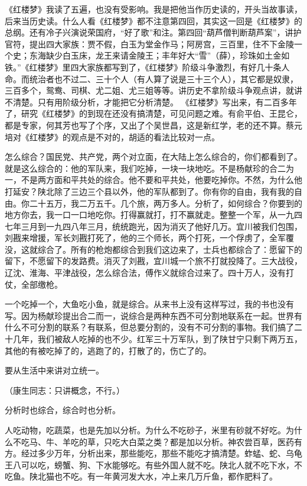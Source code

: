 《红楼梦》我读了五遍，也没有受影响。我是把他当作历史读的，开头当故事读，后来当历史读。什么人看《红楼梦》都不注意第四回，其实这一回是《红楼梦》的总纲。还有冷子兴演说荣国府，“好了歌”和注。第四回“葫芦僧判断葫芦案”，讲护官符，提出四大家族：贾不假，白玉为堂金作马；阿房宫，三百里，住不下金陵一个史；东海缺少白玉床，龙王来请金陵王；丰年好大“雪”（薛），珍珠如土金如铁。”《红楼梦》里四大家族都写到了，《红楼梦》阶级斗争激烈，有好几十条人命。而统治者也不过二、三十个人（有人算了说是三十三个人），其它都是奴隶，三百多个，鸳鸯、司棋、尤二姐、尤三姐等等。讲历史不拿阶级斗争观点讲，就讲不清楚。只有用阶级分析，才能把它分析清楚。 《红楼梦》写出来，有二百多年了，研究《红楼梦》的到现在还没有搞清楚，可见问题之难。有俞平伯、王昆仑，都是专家，何其芳也写了个序，又出了个吴世昌，这是新红学，老的还不算。蔡元培对《红楼梦》的观点是不对的，胡适的看法比较对一点。

怎么综合？国民党、共产党，两个对立面，在大陆上怎么综合的，你们都看到了。就是这么综合的：他的军队来，我们吃掉，一块一块地吃。不是杨献珍的合二为一，不是两方面和平共处的综合。他不要和平共处，他要吃掉你。不然，为什么他打延安？陕北除了三边三个县以外，他的军队都到了。你有你的自由，我有我的自由。你二十五万，我二万五千。几个旅，两万多人。分析了，如何综合？你要到的地方你去，我一口一口地吃你。打得赢就打，打不赢就走。整整一个军，从一九四七年三月到一九四八年三月，统统跑光，因为消灭了他好几万。宜川被我们包围，刘戡来增援，军长刘戡打死了，他的三个师长，两个打死，一个俘虏了，全军覆没，这就综合了。所有的枪炮都综合到我们这边来了，士兵也都综合了：愿留下的留下，不愿留下的发路费。消灭了刘戡，宜川城一个旅不打就投降了。三大战役，辽沈、淮海、平津战役，怎么综合法，傅作义就综合过来了。四十万人，没有打仗，全部缴枪。

一个吃掉一个，大鱼吃小鱼，就是综合。从来书上没有这样写过，我的书也没有写。因为杨献珍提出合二而一，说综合是两种东西不可分割地联系在一起。世界有什么不可分割的联系？有联系，但总要分割的，没有不可分割的事物。我们搞了二十几年，我们被敌人吃掉的也不少。红军三十万军队，到了陕甘宁只剩下两万五，其他的有被吃掉了的，逃跑了的，打散了的，伤亡了的。

要从生活中来讲对立统一。

（康生同志：只讲概念，不行。）

分析时也综合，综合时也分析。

人吃动物，吃蔬菜，也是先加以分析。为什么不吃砂子，米里有砂就不好吃。为什么不吃马、牛、羊吃的草，只吃大白菜之类？都是加以分析。神农尝百草，医药有方。经过多少万年，分析出来，那些能吃，那些不能吃才搞清楚。蚱蜢、蛇、乌龟王八可以吃，螃蟹、狗、下水能够吃。有些外国人就不吃。陕北人就不吃下水，不吃鱼。陕北猫也不吃。有一年黄河发大水，冲上来几万斤鱼，都作肥料了。

